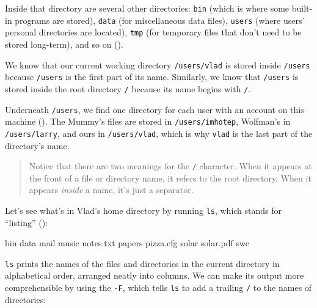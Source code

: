 Inside that directory are several other directories: \texttt{bin} (which
is where some built-in programs are stored), \texttt{data} (for
miscellaneous data files), \texttt{users} (where users' personal
directories are located), \texttt{tmp} (for temporary files that don't
need to be stored long-term), and so on ().


We know that our current working directory \texttt{/users/vlad} is
stored inside \texttt{/users} because \texttt{/users} is the first part
of its name. Similarly, we know that \texttt{/users} is stored inside
the root directory \texttt{/} because its name begins with \texttt{/}.

Underneath \texttt{/users}, we find one directory for each user with an
account on this machine (). The Mummy's files are stored in
\texttt{/users/imhotep}, Wolfman's in \texttt{/users/larry}, and ours in
\texttt{/users/vlad}, which is why \texttt{vlad} is the last part of the
directory's name.


\begin{quote} %
Notice that there are two meanings for the \texttt{/} character. When it
appears at the front of a file or directory name, it refers to the root
directory. When it appears \emph{inside} a name, it's just a separator.
\end{quote}

Let's see what's in Vlad's home directory by running \texttt{ls}, which
stands for ``listing'' ():


\begin{VerbOut}
bin          data      mail       music
notes.txt    papers    pizza.cfg  solar
solar.pdf    swc
\end{VerbOut}


\texttt{ls} prints the names of the files and directories in the current
directory in alphabetical order, arranged neatly into columns. We can
make its output more comprehensible by using the
 \texttt{-F}, which tells
\texttt{ls} to add a trailing \texttt{/} to the names of directories:

